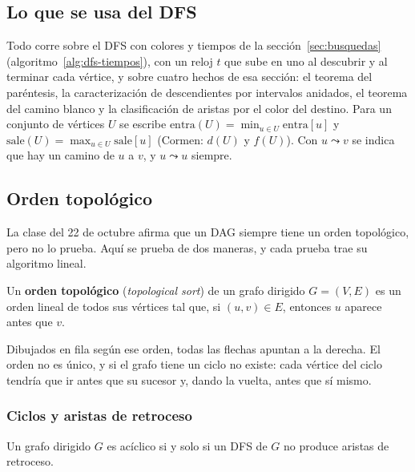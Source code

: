 \documentclass[11pt,letterpaper]{article}
\begin{document}
\subsection*{Lo que se usa del DFS}

Todo corre sobre el DFS con colores y tiempos de la
sección~\ref{sec:busquedas} (algoritmo~\ref{alg:dfs-tiempos}), con un
reloj $t$ que sube en uno al descubrir y al terminar cada vértice, y
sobre cuatro hechos de esa sección: el teorema del paréntesis, la
caracterización de descendientes por intervalos anidados, el teorema
del camino blanco y la clasificación de aristas por el color del
destino. Para un conjunto de vértices $U$ se escribe
$\text{entra}(U) = \min_{u \in U} \text{entra}[u]$ y
$\text{sale}(U) = \max_{u \in U} \text{sale}[u]$ (Cormen: $d(U)$ y
$f(U)$). Con $u \leadsto v$ se indica que hay un camino de $u$ a $v$,
y $u \leadsto u$ siempre.


\subsection*{Orden topológico}

La clase del 22 de octubre afirma que un DAG siempre tiene un orden
topológico, pero no lo prueba. Aquí se prueba de dos maneras, y cada
prueba trae su algoritmo lineal.

\begin{definicion}
  \label{def:orden-topologico}
  Un \textbf{orden topológico} (\textit{topological sort}) de un grafo
  dirigido $G = (V, E)$ es un orden lineal de todos sus vértices tal
  que, si $(u, v) \in E$, entonces $u$ aparece antes que $v$.
\end{definicion}

Dibujados en fila según ese orden, todas las flechas apuntan a la
derecha. El orden no es único, y si el grafo tiene un ciclo no existe:
cada vértice del ciclo tendría que ir antes que su sucesor y, dando la
vuelta, antes que sí mismo.

\subsubsection*{Ciclos y aristas de retroceso}

\begin{lema}
  \label{lem:aciclico-retroceso}
  Un grafo dirigido $G$ es acíclico si y solo si un DFS de $G$ no
  produce aristas de retroceso.
\end{lema}
\end{document}
